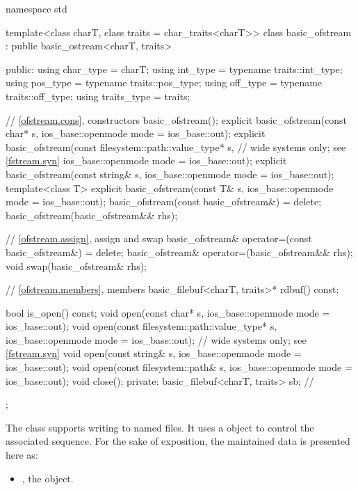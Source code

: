 %
\begin{codeblock}
namespace std {
  template<class charT, class traits = char_traits<charT>>
  class basic_ofstream : public basic_ostream<charT, traits> {
  public:
    using char_type   = charT;
    using int_type    = typename traits::int_type;
    using pos_type    = typename traits::pos_type;
    using off_type    = typename traits::off_type;
    using traits_type = traits;

    // \ref{ofstream.cons}, constructors
    basic_ofstream();
    explicit basic_ofstream(const char* s,
                            ios_base::openmode mode = ios_base::out);
    explicit basic_ofstream(const filesystem::path::value_type* s,  // wide systems only; see \ref{fstream.syn}
                            ios_base::openmode mode = ios_base::out);
    explicit basic_ofstream(const string& s,
                            ios_base::openmode mode = ios_base::out);
    template<class T>
      explicit basic_ofstream(const T& s, ios_base::openmode mode = ios_base::out);
    basic_ofstream(const basic_ofstream&) = delete;
    basic_ofstream(basic_ofstream&& rhs);

    // \ref{ofstream.assign}, assign and swap
    basic_ofstream& operator=(const basic_ofstream&) = delete;
    basic_ofstream& operator=(basic_ofstream&& rhs);
    void swap(basic_ofstream& rhs);

    // \ref{ofstream.members}, members
    basic_filebuf<charT, traits>* rdbuf() const;

    bool is_open() const;
    void open(const char* s, ios_base::openmode mode = ios_base::out);
    void open(const filesystem::path::value_type* s,
              ios_base::openmode mode = ios_base::out);     // wide systems only; see \ref{fstream.syn}
    void open(const string& s, ios_base::openmode mode = ios_base::out);
    void open(const filesystem::path& s, ios_base::openmode mode = ios_base::out);
    void close();
  private:
    basic_filebuf<charT, traits> sb;    // \expos
  };
}
\end{codeblock}

\pnum
The class
supports writing to named files.
It uses a
object to control the associated
sequence.
For the sake of exposition, the maintained data is presented here as:
\begin{itemize}
\item
{}, the  object.
\end{itemize}

